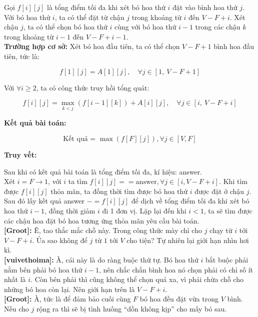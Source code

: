 Gọi $f[i][j]$ là tổng điểm tối đa khi xét bó hoa thứ $i$ đặt vào bình hoa thứ $j$.\\

Với bó hoa thứ $i$, ta có thể đặt từ chậu $j$ trong khoảng từ  $i$ đến $V - F + i$. Xét chậu $j$, ta có thể chọn bó hoa thứ $i$ cùng với bó hoa thứ $i - 1$ trong các chậu $k$ trong khoảng từ $i - 1$ đến $V - F + i - 1$.\\

\textbf{Trường hợp cơ sở:} Xét bó hoa đầu tiên, ta có thể chọn $V - F + 1$ bình hoa đầu tiên, tức là:

\[
f[1][j] = A[1][j], \quad \forall j \in [1,\ V - F + 1]
\]

Với $\forall i \geq 2$, ta có công thức truy hồi tổng quát:

\[
f[i][j] = \max_{k < j} \left( f[i-1][k] \right) + A[i][j], \quad \forall j \in [i,\ V - F + i]
\]

\textbf{Kết quả bài toán:}

\[
\text{Kết quả = } \max \left( f[F][j] \right), \forall j \in [V, F]
\]

\textbf{Truy vết:}

Sau khi có kết quả bài toán là tổng điểm tối đa, kí hiệu: answer.\\

Xét $i = F \rightarrow 1$, với $i$ ta tìm $f[i][j] == \text{answer}, \forall j \in [i, V - F + i]$. Khi tìm được $f[i][j]$ thỏa mãn, ta đồng thời tìm được bó hoa thứ $i$ được đặt ở chậu $j$. Sau đó lấy kết quả answer $-= f[i][j]$ để dịch về tổng điểm tối đa khi xét bó hoa thứ $i - 1$, đồng thời giảm $i$ đi 1 đơn vị. Lặp lại đến khi $i < 1$, ta sẽ tìm được các chậu hoa đặt bó hoa tương ứng thỏa mãn yêu cầu bài toán.\\

\textbf{[Groot]:} Ê, tao thắc mắc chỗ này. Trong công thức mày chỉ cho $j$ chạy từ $i$ tới $V - F + i$. 
Ủa sao không để $j$ từ $1$ tới $V$ cho tiện? 
Tự nhiên lại giới hạn nhìn hơi kì.\\

\textbf{[vuivethoima]:} À, cái này là do ràng buộc thứ tự. 
Bó hoa thứ $i$ bắt buộc phải nằm bên phải bó hoa thứ $i-1$, nên chắc chắn bình hoa nó chọn phải có chỉ số ít nhất là $i$.  
Còn bên phải thì cũng không thể chọn quá xa, vì phải chừa chỗ cho những bó hoa còn lại. 
Nên giới hạn trên là $V - F + i$.\\

\textbf{[Groot]:} À, tức là để đảm bảo cuối cùng $F$ bó hoa đều đặt vừa trong $V$ bình. 
Nếu cho $j$ rộng ra thì sẽ bị tình huống ``dồn không kịp'' cho mấy bó sau.\\

